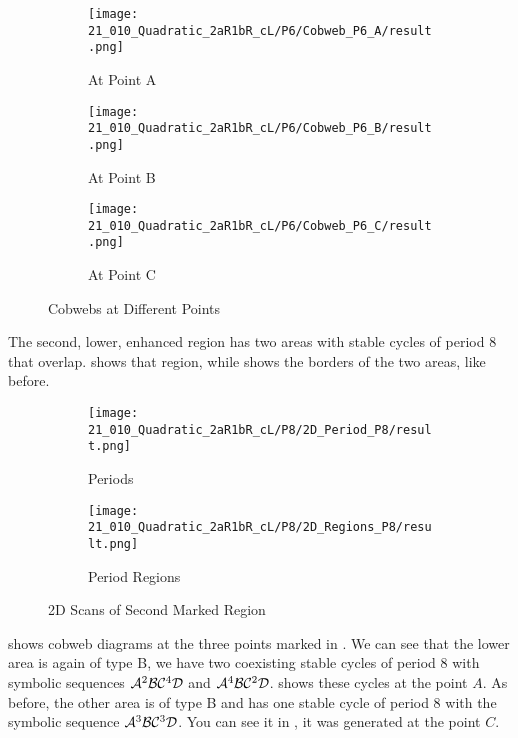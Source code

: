 \begin{figure}
    \centering
    \begin{subfigure}{0.3\textwidth}
        \centering
        \texttt{[image: 21\_010\_Quadratic\_2aR1bR\_cL/P6/Cobweb\_P6\_A/result.png]}
        \caption{At Point A}
        \label{fig:quad.full.2aR1bR_cL.1.CobwebA}
    \end{subfigure}
    \begin{subfigure}{0.3\textwidth}
        \centering
        \texttt{[image: 21\_010\_Quadratic\_2aR1bR\_cL/P6/Cobweb\_P6\_B/result.png]}
        \caption{At Point B}
        \label{fig:quad.full.2aR1bR_cL.1.CobwebB}
    \end{subfigure}
    \begin{subfigure}{0.3\textwidth}
        \centering
        \texttt{[image: 21\_010\_Quadratic\_2aR1bR\_cL/P6/Cobweb\_P6\_C/result.png]}
        \caption{At Point C}
        \label{fig:quad.full.2aR1bR_cL.1.CobwebC}
    \end{subfigure}
    \caption{Cobwebs at Different Points}
    \label{fig:quad.full.2aR1bR_cL.1.Cobwebs}
\end{figure}

The second, lower, enhanced region has two areas with stable cycles of period 8 that overlap.
 shows that region, while  shows the borders of the two areas, like before.

\begin{figure}
    \centering
    \begin{subfigure}{0.4\textwidth}
        \centering
        \texttt{[image: 21\_010\_Quadratic\_2aR1bR\_cL/P8/2D\_Period\_P8/result.png]}
        \caption{Periods}
        \label{fig:quadratic.full.2aR1bR_cL.2d.2}
    \end{subfigure}
    \begin{subfigure}{0.4\textwidth}
        \centering
        \texttt{[image: 21\_010\_Quadratic\_2aR1bR\_cL/P8/2D\_Regions\_P8/result.png]}
        \caption{Period Regions}
        \label{fig:quadratic.regions.2aR1bR_cL.2d.2}
    \end{subfigure}
    \caption{2D Scans of Second Marked Region}
\end{figure}

 shows cobweb diagrams at the three points marked in .
We can see that the lower area is again of type B, we have two coexisting stable cycles of period 8 with symbolic sequences $\mathcal{A}^2\mathcal{B}\mathcal{C}^4\mathcal{D}$ and $\mathcal{A}^4\mathcal{B}\mathcal{C}^2\mathcal{D}$.
 shows these cycles at the point $A$.
As before, the other area is of type B and has one stable cycle of period 8 with the symbolic sequence $\mathcal{A}^3\mathcal{B}\mathcal{C}^3\mathcal{D}$.
You can see it in , it was generated at the point $C$.

